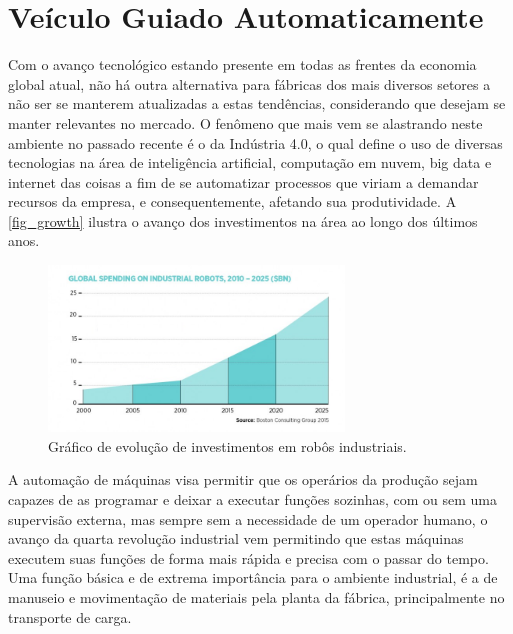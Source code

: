 \section{Ve{\'i}culo Guiado Automaticamente}

Com o avanço tecnológico estando presente em todas as frentes da economia
global atual, não há outra alternativa para fábricas dos mais diversos setores
a não ser se manterem atualizadas a estas tendências, considerando que desejam se
manter relevantes no mercado. O fenômeno que mais vem se alastrando neste
ambiente no passado recente é o da Indústria 4.0, o qual define o uso de
diversas tecnologias na área de inteligência artificial, computação em nuvem,
big data e internet das coisas a fim de se automatizar processos que viriam a
demandar recursos da empresa, e consequentemente, afetando sua produtividade.
A \autoref{fig_growth} ilustra o avan{\c c}o dos investimentos na {\'a}rea ao longo
dos {\'u}ltimos anos.

\begin{figure}[htb]
        \centering
        \caption{\label{fig_growth}Gr{\'a}fico de evolu{\c c}{\~a}o de investimentos em rob{\^o}s industriais.}
        \includegraphics[width=0.7\textwidth]{images/Global-spending-industrial-robots-760x428.png}
\end{figure}


A automação de máquinas visa permitir que os operários da produção sejam
capazes de as programar e deixar a executar funções sozinhas, com ou sem uma
supervisão externa, mas sempre sem a necessidade de um operador humano, o
avanço da quarta revolução industrial vem permitindo que estas máquinas
executem suas funções de forma mais rápida e precisa com o passar do tempo. Uma
função básica e de extrema importância para o ambiente industrial, é a de
manuseio e movimentação de materiais pela planta da fábrica, principalmente no
transporte de carga. 

